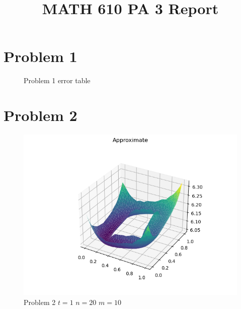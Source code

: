 \documentclass{report}
\title{MATH 610 PA 3 Report}
\author{}
\date{}
\begin{document}
\maketitle
\chapter*{Problem 1}
\begin{figure}[h]
	\caption{Problem 1 error table}
\end{figure}

\chapter*{Problem 2}
\begin{figure}[h]
	\caption{Problem 2 $t = 1$ $n = 20$ $m = 10$}
	\includegraphics[width=\textwidth]{example.png}
\end{figure}
\end{document}
